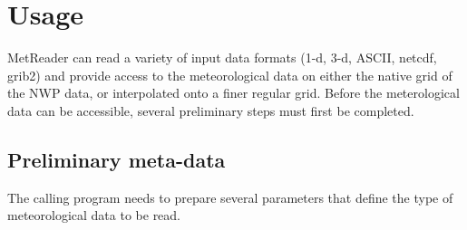 \documentclass[11pt]{article}   %
\begin{document}
\clearpage
\section{Usage}
MetReader can read a variety of input data formats (1-d, 3-d, ASCII, netcdf, grib2) and
provide access to the meteorological data on either the native grid of the NWP data, or interpolated
onto a finer regular grid.  Before the meterological data can be accessible, several preliminary steps
must first be completed.
\subsection{Preliminary meta-data}
The calling program needs to prepare several parameters that define the type of meteorological
data to be read.  
\end{document}
